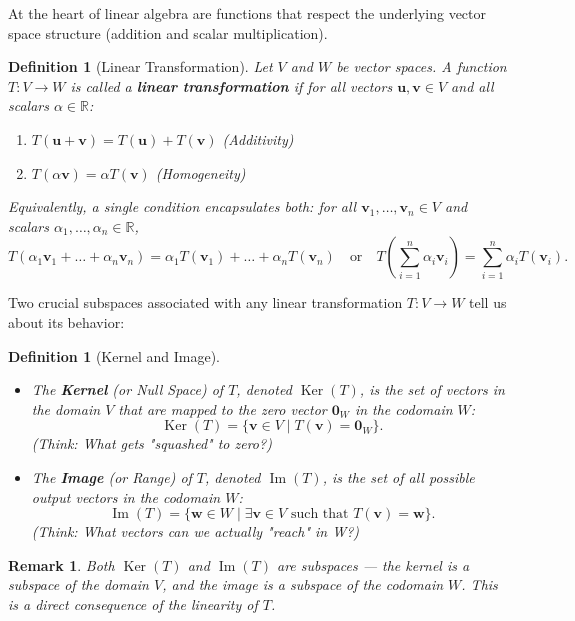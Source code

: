 \documentclass[11pt, a4paper]{article}
\theoremstyle{mytheoremstyle}
\theoremstyle{mydefstyle}
\newtheorem{definition}[theorem]{Definition}
\newtheorem{remark}[theorem]{Remark}
\newcommand{\R}{\mathbb{R}}      %
\newcommand{\vb}{\mathbf{v}}     %
\newcommand{\wb}{\mathbf{w}}     %
\newcommand{\ub}{\mathbf{u}}     %
\newcommand{\zerob}{\mathbf{0}}  %
\DeclareMathOperator{\Ker}{Ker}  %
\DeclareMathOperator{\Img}{Im}   %
\begin{document}
At the heart of linear algebra are functions that respect the underlying vector space structure (addition and scalar multiplication).

\begin{definition}[Linear Transformation]
Let $V$ and $W$ be vector spaces. A function $T: V \to W$ is called a \textbf{linear transformation} if for all vectors $\ub, \vb \in V$ and all scalars $\alpha \in \R$:
\begin{enumerate}
    \item $T(\ub + \vb) = T(\ub) + T(\vb)$ (Additivity)
    \item $T(\alpha \vb) = \alpha T(\vb)$ (Homogeneity)
\end{enumerate}
Equivalently, a single condition encapsulates both: for all $\vb_1, \dots, \vb_n \in V$ and scalars $\alpha_1, \dots, \alpha_n \in \R$,
\[ T(\alpha_1 \vb_1 + \dots + \alpha_n \vb_n) = \alpha_1 T(\vb_1) + \dots + \alpha_n T(\vb_n) \quad \text{or} \quad T\left(\sum_{i=1}^n \alpha_i \vb_i\right) = \sum_{i=1}^n \alpha_i T(\vb_i). \]
\end{definition}

Two crucial subspaces associated with any linear transformation $T: V \to W$ tell us about its behavior:

\begin{definition}[Kernel and Image]
\leavevmode
\begin{itemize}
    \item The \textbf{Kernel} (or Null Space) of $T$, denoted $\Ker(T)$, is the set of vectors in the domain $V$ that are mapped to the zero vector $\zerob_W$ in the codomain $W$:
    \[ \Ker(T) = \{ \vb \in V \mid T(\vb) = \zerob_W \}. \]
    (\textit{Think: What gets "squashed" to zero?})
    \item The \textbf{Image} (or Range) of $T$, denoted $\Img(T)$, is the set of all possible output vectors in the codomain $W$:
    \[ \Img(T) = \{ \wb \in W \mid \exists \vb \in V \text{ such that } T(\vb) = \wb \}. \]
    (\textit{Think: What vectors can we actually "reach" in W?})
\end{itemize}
\end{definition}

\begin{remark}
Both $\Ker(T)$ and $\Img(T)$ are subspaces --- the kernel is a subspace of the domain $V$, and the image is a subspace of the codomain $W$. This is a direct consequence of the linearity of $T$.
\end{remark}
\end{document}
